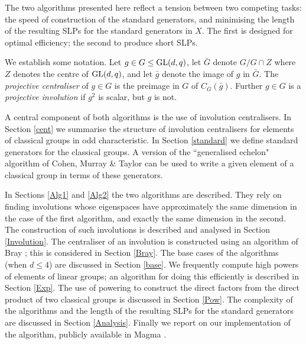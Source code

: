 \documentclass[12pt]{article}
\def\GL{{\rm GL}}
\begin{document}
The two algorithms presented here reflect a tension 
between two competing tasks: the speed of construction
of the standard generators, and minimising the 
length of the resulting SLPs for the standard 
generators in $X$.
The first is designed for optimal efficiency; 
the second to produce short SLPs.

We establish some notation. 
Let $g\in G \leq \GL(d, q)$, 
let $\bar{G}$ denote $G / G \cap Z$
where $Z$ denotes the centre of $\GL(d, q)$,
and let $\bar{g}$ denote the image of $g$ in $\bar{G}$.
The {\it projective centraliser} of $g \in G$
is the preimage in $G$ of $C_{\bar{G}} (\bar{g})$.
Further $g \in G$ is a {\it projective involution} 
if $g^2$ is scalar, but $g$ is not.

A central component of both algorithms
is the use of involution centralisers.
In Section \ref{cent} we summarise
the structure of involution centralisers
for elements of classical groups in odd characteristic.
In Section \ref{standard} we define
standard generators for the classical groups.
A version of the ``generalised echelon" algorithm 
of Cohen, Murray \& Taylor \cite{CMT} can 
be used to write a given element of a classical group in
terms of these generators. 

In Sections \ref{Alg1} and \ref{Alg2} the two 
algorithms are described. They
rely on finding involutions  whose eigenspaces  have
approximately the same  dimension in the case of the first algorithm,
and exactly the same dimension  in the second. The construction of
such involutions is described and analysed in Section \ref{Involution}.
The centraliser of an involution  is constructed using an 
algorithm of Bray \cite{Bray}; this is considered
in Section \ref{Bray}. The base cases of the
algorithms (when $d \leq 4$) are discussed in Section \ref{base}. 
We frequently compute high powers of elements of linear groups; 
an algorithm for doing this
efficiently is described in Section \ref{Exp}. The use of powering to
construct the direct factors from the direct product of two classical
groups is discussed in Section \ref{Pow}. 
The complexity of the algorithms and the 
length of the resulting SLPs for the standard generators
are discussed in Section \ref{Analysis}.  
Finally we report on our implementation of the algorithm, 
publicly available in {\sc Magma} \cite{Magma}.
\end{document}
